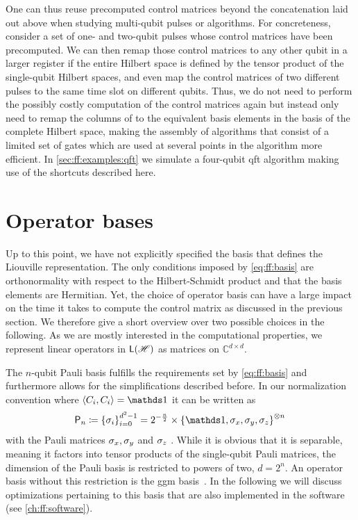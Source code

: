 One can thus reuse precomputed control matrices beyond the concatenation laid out above when studying multi-qubit pulses or algorithms.
For concreteness, consider a set of one- and two-qubit pulses whose control matrices have been precomputed.
We can then remap those control matrices to any other qubit in a larger register if the entire Hilbert space is defined by the tensor product of the single-qubit Hilbert spaces, and even map the control matrices of two different pulses to the same time slot on different qubits.
Thus, we do not need to perform the possibly costly computation of the control matrices again but instead only need to remap the columns of \ctrlmat to the equivalent basis elements in the basis of the complete Hilbert space, making the assembly of algorithms that consist of a limited set of gates which are used at several points in the algorithm more efficient.
In \cref{sec:ff:examples:qft} we simulate a four-qubit \gls{qft} algorithm making use of the shortcuts described here.

\section{Operator bases}\label{sec:ff:performance:basis}
Up to this point, we have not explicitly specified the basis that defines the Liouville representation.
The only conditions imposed by \cref{eq:ff:basis} are orthonormality with respect to the Hilbert-Schmidt product and that the basis elements are Hermitian.
Yet, the choice of operator basis can have a large impact on the time it takes to compute the control matrix as discussed in the previous section.
We therefore give a short overview over two possible choices in the following.
As we are mostly interested in the computational properties, we represent linear operators in $\mathsf{L}(\mathscr{H})$ as matrices on $\mathbb{C}^{d\times d}$.

The $n$-qubit Pauli basis fulfills the requirements set by \cref{eq:ff:basis} and furthermore allows for the simplifications described before.
In our normalization convention where $\dotHS{C_i}{C_i} = \eye$ it can be written as
\begin{equation}\label{eq:ff:basis:pauli}
    \mathsf{P}_n \coloneqq \left\lbrace\sigma_i\right\rbrace_{i=0}^{d^2-1} = 2^{-\frac{n}{2}}\times\left\lbrace \eye, \sx, \sy, \sz \right\rbrace^{\otimes n}
\end{equation}
with the Pauli matrices $\sigma_x,\sigma_y$ and $\sigma_z$ .
While it is obvious that it is separable, meaning it factors into tensor products of the single-qubit Pauli matrices, the dimension of the Pauli basis is restricted to powers of two, $d = 2^n$.
An operator basis without this restriction is the \gls{ggm} basis~\cite{Kimura2003,Bertlmann2008}.
In the following we will discuss optimizations pertaining to this basis that are also implemented in the software (see \cref{ch:ff:software}).


